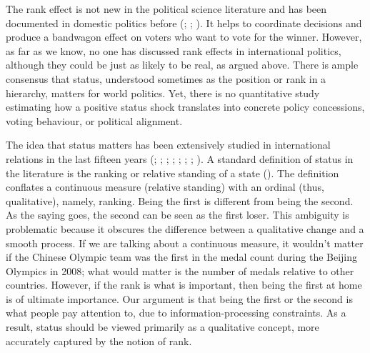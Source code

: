 \documentclass[
  12pt,
]{article}
\begin{document}
The rank effect is not new in the political science literature and has
been documented in domestic politics before
(;
;
). It
helps to coordinate decisions and produce a bandwagon effect on voters
who want to vote for the winner. However, as far as we know, no one has
discussed rank effects in international politics, although they could be
just as likely to be real, as argued above. There is ample consensus
that status, understood sometimes as the position or rank in a
hierarchy, matters for world politics. Yet, there is no quantitative
study estimating how a positive status shock translates into concrete
policy concessions, voting behaviour, or political alignment.

The idea that status matters has been extensively studied in
international relations in the last fifteen years
(;
;
;
;
; ; ;
). A standard definition of status
in the literature is the ranking or relative standing of a state
(). The
definition conflates a continuous measure (relative standing) with an
ordinal (thus, qualitative), namely, ranking. Being the first is
different from being the second. As the saying goes, the second can be
seen as the first loser. This ambiguity is problematic because it
obscures the difference between a qualitative change and a smooth
process. If we are talking about a continuous measure, it wouldn't
matter if the Chinese Olympic team was the first in the medal count
during the Beijing Olympics in 2008; what would matter is the number of
medals relative to other countries. However, if the rank is what is
important, then being the first at home is of ultimate importance. Our
argument is that being the first or the second is what people pay
attention to, due to information-processing constraints. As a result,
status should be viewed primarily as a qualitative concept, more
accurately captured by the notion of rank.
\end{document}
